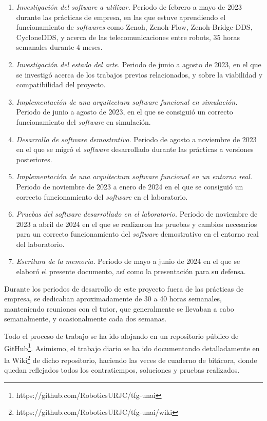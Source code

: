 \begin{enumerate}
    \item{\textit{Investigación del software a utilizar.} Periodo de febrero a
        mayo de 2023 durante las prácticas de empresa, en las que estuve
        aprendiendo el funcionamiento de \textit{softwares} como Zenoh,
        Zenoh-Flow, Zenoh-Bridge-DDS, CycloneDDS, y acerca de las
        telecomunicaciones entre robots, 35 horas semanales durante 4 meses.}
    \item{\textit{Investigación del estado del arte.} Periodo de junio a agosto
        de 2023, en el que se investigó acerca de los trabajos previos
        relacionados, y sobre la viabilidad y compatibilidad del proyecto.}
    \item{\textit{Implementación de una arquitectura software funcional en
        simulación.} Periodo de junio a agosto de 2023, en el que se consiguió
        un correcto funcionamiento del \textit{software} en simulación.}
    \item{\textit{Desarrollo de software demostrativo.} Periodo de agosto a
        noviembre de 2023 en el que se migró el \textit{software} desarrollado
        durante las prácticas a versiones posteriores.}
    \item{\textit{Implementación de una arquitectura software funcional en un
        entorno real.} Periodo de noviembre de 2023 a enero de 2024 en el que se
        consiguió un correcto funcionamiento del \textit{software} en el
        laboratorio.}
    \item{\textit{Pruebas del software desarrollado en el laboratorio.} Periodo
        de noviembre de 2023 a abril de 2024 en el que se realizaron las pruebas
        y cambios necesarios para un correcto funcionamiento del
        \textit{software} demostrativo en el entorno real del laboratorio.}
    \item{\textit{Escritura de la memoria.} Periodo de mayo a junio de 2024 en el
        que se elaboró el presente documento, así como la presentación para su
        defensa.}
\end{enumerate}

Durante los periodos de desarrollo de este proyecto fuera de las prácticas de
empresa, se dedicaban aproximadamente de 30 a 40 horas semanales, manteniendo
reuniones con el tutor, que generalmente se llevaban a cabo semanalmente, y
ocasionalmente cada dos semanas.

Todo el proceso de trabajo se ha ido alojando en un repositorio público de
GitHub\footnote{https://github.com/RoboticsURJC/tfg-unai}.
Asimismo, el trabajo diario se ha ido documentando detalladamente en la
Wiki\footnote{https://github.com/RoboticsURJC/tfg-unai/wiki} de dicho
repositorio, haciendo las veces de cuaderno de bitácora, donde quedan reflejados
todos los contratiempos, soluciones y pruebas realizados.

